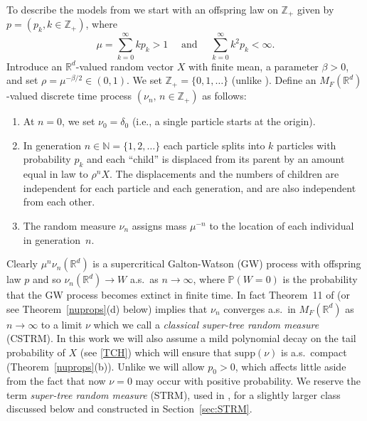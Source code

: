 \documentclass[12pt]{article}
\numberwithin{theorem}{section}
\theoremstyle{def}
\numberwithin{equation}{section}
\renewcommand{\P}{\mathbb{P}}
\newcommand{\R}{\mathbb{R}}
\newcommand{\Z}{\mathbb{Z}}
\newcommand{\N}{\mathbb{N}}
\newcommand{\supp}{\mathrm{supp}}
\begin{document}
To describe the models from \cite{ADHP} we start with an offspring law on $\Z_+$ given by $p=(p_k,k\in\Z_+)$, where
\begin{equation}\label{pk}
\mu=\sum_{k=0}^\infty kp_k>1\quad \text{ and } \quad \sum_{k=0}^\infty k^2p_k<\infty.
\end{equation}
Introduce an $\R^d$-valued random vector $X$ with finite mean, a parameter $\beta>0$, and set $\rho=\mu^{-\beta/2}\in(0,1)$.  
We set $\Z_+=\{0,1,\dots\}$ (unlike \cite{ADHP}). 
Define an $M_F(\R^d)$-valued discrete time process $(\nu_n, \, n\in\Z_+)$ as follows:
\begin{enumerate}[label=\emph{(\alph*)}, ref=(\alph*)]
\item At $n=0$, we set $\nu_0=\delta_0$ (i.e., a single particle starts at the origin).
\item In generation $n\in\N=\{1,2,\dots\}$ each particle splits into $k$ particles with probability $p_k$ and each ``child'' is displaced from its parent by an amount equal in law to $\rho^n X$.  
The displacements and the numbers of children are independent for each particle and each generation, and are also independent from each other.
\item \label{it:nuprops:iii} The random measure $\nu_n$ assigns mass $\mu^{-n}$ to the location of each individual in generation~$n$.
\end{enumerate}
Clearly $\mu^n\nu_n(\R^d)$ is a supercritical Galton-Watson (GW) process with offspring law $p$ and so 
$\nu_n(\R^d)\to W$ a.s.\ as $n\rightarrow \infty$, where $\P(W=0)$ is the probability that the GW process becomes extinct in finite time.
In fact Theorem~11 of \cite{ADHP} (or see Theorem~\ref{nuprops}(d) below) implies that $\nu_n$ converges a.s.\ in $M_F(\R^d)$ as $n\to\infty$ to a limit $\nu$ which we call a {\it classical super-tree random measure} (CSTRM).
In this work we will also assume a mild polynomial decay on the tail probability of $X$ (see \eqref{TCH}) which will ensure that $\supp(\nu)$ is a.s.\ compact (Theorem~\ref{nuprops}(b)).
 Unlike \cite{ADHP} we will allow $p_0>0$, which affects little aside from the fact that now $\nu=0$ may occur with positive probability. 
 We reserve the term {\it super-tree random measure}  (STRM), used in \cite{ADHP}, for a slightly larger class discussed below and constructed in Section~\ref{sec:STRM}. 
\end{document}
